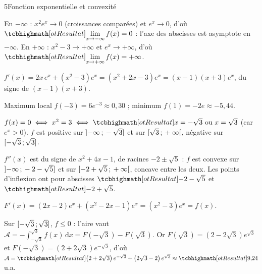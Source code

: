 \begin{corrigeBac}{5}{Fonction exponentielle et convexité}
\begin{questions}
  \item En $-\infty$ : $x^{2}e^{x}\to0$ (croissances comparées) et $e^{x}\to0$, d'où $\res{\lim\limits_{x\to-\infty}f(x)=0}$ : l'axe des
    abscisses est asymptote en $-\infty$. En $+\infty$ : $x^{2}-3\to+\infty$ et $e^{x}\to+\infty$, d'où $\res{\lim\limits_{x\to+\infty}f(x)=+\infty}$. \pts{1 pt}
  \item $f'(x)=2x\,e^{x}+\left(x^{2}-3\right)e^{x}=\left(x^{2}+2x-3\right)e^{x}=(x-1)(x+3)e^{x}$, du signe de $(x-1)(x+3)$.
\begin{center}
\begin{tableau}
\end{tableau}
\end{center}
    Maximum local $f(-3)=6e^{-3}\approx0{,}30$ ; minimum $f(1)=-2e\approx-5{,}44$. \pts{1 pt}
  \item $f(x)=0\iff x^{2}=3\iff\res{x=-\sqrt3\text{ ou }x=\sqrt3}$ (car $e^{x}>0$). $f$ est positive sur $\mathopen{]}-\infty\,{;}\,-\sqrt3\mathclose{]}$ et sur
    $\mathopen{[}\sqrt3\,{;}\,+\infty\mathclose{[}$, négative sur $\mathopen{[}-\sqrt3\,{;}\,\sqrt3\mathclose{]}$. 
\end{questions}
\begin{questions}[resume]
  \item $f''(x)$ est du signe de $x^{2}+4x-1$, de racines $-2\pm\sqrt5$ : $f$ est convexe sur $\mathopen{]}-\infty\,{;}\,-2-\sqrt5\mathclose{]}$ et sur
    $\mathopen{[}-2+\sqrt5\,{;}\,+\infty\mathclose{[}$, concave entre les deux. Les points d'inflexion ont pour abscisses $\res{-2-\sqrt5}$ et $\res{-2+\sqrt5}$. \pts{1 pt}
  \item $F'(x)=(2x-2)e^{x}+\left(x^{2}-2x-1\right)e^{x}=\left(x^{2}-3\right)e^{x}=f(x)$. 
  \item Sur $\mathopen{[}-\sqrt3\,{;}\,\sqrt3\mathclose{]}$, $f\leq0$ : l'aire vaut $\mathcal{A}=-\int_{-\sqrt3}^{\sqrt3}f(x)\,\mathrm{d}x=F\left(-\sqrt3\right)-F\left(\sqrt3\right)$.
    Or $F\left(\sqrt3\right)=\left(2-2\sqrt3\right)e^{\sqrt3}$ et $F\left(-\sqrt3\right)=\left(2+2\sqrt3\right)e^{-\sqrt3}$, d'où
    $\mathcal{A}=\res{\left(2+2\sqrt3\right)e^{-\sqrt3}+\left(2\sqrt3-2\right)e^{\sqrt3}}\approx\res{9{,}24}$ u.a. 
\end{questions}
\end{corrigeBac}

